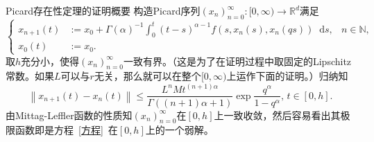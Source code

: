 \documentclass[aspectratio=16 9, 10pt, notheorems]{ctexbeamer}
\let\oldeqref\eqref
\renewcommand{\eqref}[1]{~\oldeqref{#1}~}
\newcommand{\mainEquation}{方程\eqref{方程}}
\newcommand{\differential}{\mathop{}\!\mathrm{d}}
\newcommand{\realset}{\mathbb{R}}
\newcommand{\naturalset}{\mathbb{N}}
\begin{document}
\begin{frame}{Picard存在性定理的证明概要}
    构造Picard序列$\left(x_n\right)_{n=0}^\infty\colon [0,\infty)\to \realset^d$满足
    \begin{equation*}\label{PicardSequence}
        \left\{\begin{aligned}
            x_{n+1}(t)&:=x_0 + \Gamma(\alpha)^{-1} \textstyle\int_0^t (t-s)^{\alpha-1} f(s,x_n(s),x_n(qs))\differential s, & n\in \naturalset,\\
            x_0(t)&:=x_0. & {}
        \end{aligned}\right.
    \end{equation*}
    取$h$充分小，使得$\left(x_n\right)_{n=0}^\infty$一致有界。（这是为了在证明过程中取固定的Lipschitz常数。如果$L$可以与$r$无关，那么就可以在整个$[0,\infty)$上运作下面的证明。）归纳知
    \begin{equation*}
        \left\| x_{n+1}(t) - x_n(t) \right\|\leqslant \frac{L^n M t^{(n+1)\alpha}}{\Gamma((n+1)\alpha+1)} \exp \frac{q^\alpha}{1-q^\alpha},\,t\in [0,h].
    \end{equation*}
    由Mittag-Leffler函数的性质知$\left(x_n\right)_{n=0}^\infty$在$[0,h]$上一致收敛，然后容易看出其极限函数即是\mainEquation 在$[0,h]$上的一个弱解。
\end{frame}
\end{document}
